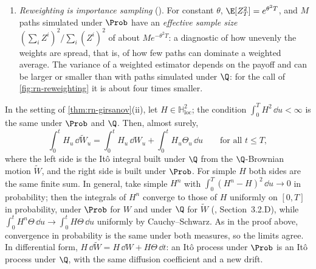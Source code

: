 \begin{remark}
\begin{enumerate}[label=(\alph*),leftmargin=*]
    L\'evy's characterisation in $d$ dimensions; see \textcite{karatzas-shreve},
    Section~3.5.A, and \textcite{shreve2}, Section~5.4.1.
  \item \emph{Reweighting is importance sampling} (). For constant
    $\theta$, $\E[Z_T^2]=e^{\theta^2T}$, and $M$ paths simulated under $\Prob$ have an
    \emph{effective sample size} $(\sum_iZ^i)^2/\sum_i(Z^i)^2$ of about $Me^{-\theta^2T}$: a
    diagnostic of how unevenly the weights are spread, that is, of how few paths can dominate
    a weighted average. The variance of a weighted estimator depends on the payoff and can be
    larger or smaller than with paths simulated under $\Q$: for the call of
    \cref{fig:rn-reweighting} it is about four times smaller.
\end{enumerate}
\end{remark}

\begin{remark}\label{rem:rn-integrals}
In the setting of \cref{thm:rn-girsanov}(ii), let $H\in\mathbb H^2_{\mathrm{loc}}$; the
condition $\int_0^TH^2\,\dd u<\infty$ is the same under $\Prob$ and $\Q$. Then, almost surely,
\begin{equation}\label{eq:rn-integrals}
  \int_0^tH_u\,\dd\widetilde W_u=\int_0^tH_u\,\dd W_u+\int_0^tH_u\Theta_u\,\dd u
  \qquad\text{for all }t\le T,
\end{equation}
where the left side is the It\^o integral built under $\Q$ from the $\Q$-Brownian motion
$\widetilde W$, and the right side is built under $\Prob$. For simple $H$ both sides are the
same finite sum. In general, take simple $H^n$ with $\int_0^T(H^n-H)^2\,\dd u\to0$ in
probability; then the integrals of $H^n$ converge to those of $H$ uniformly on $[0,T]$ in
probability, under $\Prob$ for $W$ and under $\Q$ for $\widetilde W$
(\textcite{karatzas-shreve}, Section~3.2.D), while $\int_0^tH^n\Theta\,\dd u\to\int_0^tH\Theta\,\dd u$
uniformly by Cauchy--Schwarz. As in the proof above, convergence in probability is the same
under both measures, so the limits agree. In differential form,
$H\,\dd\widetilde W=H\,\dd W+H\Theta\,\dd t$: an It\^o process under $\Prob$ is an It\^o
process under $\Q$, with the same diffusion coefficient and a new drift.
\end{remark}

